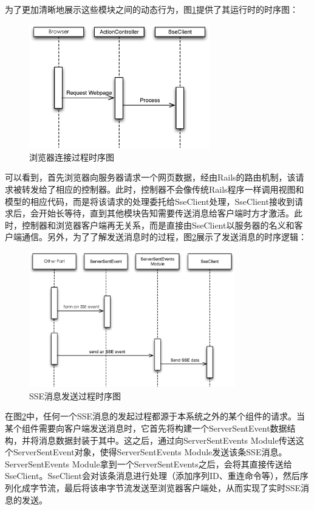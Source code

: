 为了更加清晰地展示这些模块之间的动态行为，图\ref{fig-sse-module-timing1}提供了其运行时的时序图：

\begin{figure}[h]
\centering
\includegraphics[width=0.7\textwidth]{images/overview/sse_module_timing1.eps}
\caption{浏览器连接过程时序图}
\label{fig-sse-module-timing1}
\end{figure}

可以看到，首先浏览器向服务器请求一个网页数据，经由Rails的路由机制，该请求被转发给了相应的控制器。此时，控制器不会像传统Rails程序一样调用视图和模型的相应代码，而是将该请求的处理委托给SseClient处理，SseClient接收到请求后，会开始长等待，直到其他模块告知需要传送消息给客户端时方才激活。此时，控制器和浏览器客户端再无关系，而是直接由SseClient以服务器的名义和客户端通信。另外，为了了解发送消息时的过程，图\ref{fig-sse-module-timing2}展示了发送消息的时序逻辑：

\begin{figure}[h]
\centering
\includegraphics[width=0.8\textwidth]{images/overview/sse_module_timing2.eps}
\caption{SSE消息发送过程时序图}
\label{fig-sse-module-timing2}
\end{figure}

在图\ref{fig-sse-module-timing2}中，任何一个SSE消息的发起过程都源于本系统之外的某个组件的请求。当某个组件需要向客户端发送消息时，它首先将构建一个ServerSentEvent数据结构，并将消息数据封装于其中。这之后，通过向ServerSentEvents Module传送这个ServerSentEvent对象，使得ServerSentEvents Module发送该条SSE消息。ServerSentEvents Module拿到一个ServerSentEvents之后，会将其直接传送给SseClient。SseClient会对该条消息进行处理（添加序列ID、重连命令等），然后序列化成字节流，最后将该串字节流发送至浏览器客户端处，从而实现了实时SSE消息的发送。


